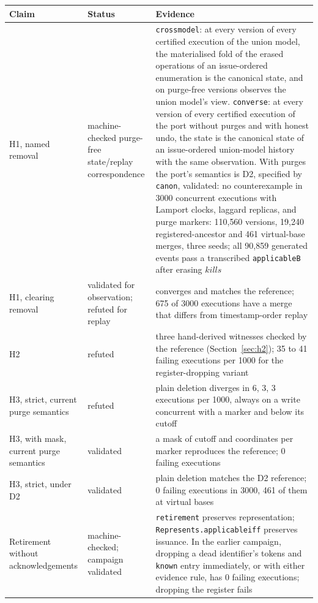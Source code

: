 \documentclass[11pt]{article}
\newcommand{\lean}[1]{\texttt{\def\_{\textunderscore\allowbreak}#1}}
\begin{document}
\begin{table}[h]
\centering\small
\begin{tabular}{@{}p{}p{}p{}@{}}
\toprule
Claim & Status & Evidence \\
\midrule
H1, named removal & machine-checked purge-free state/replay correspondence & \lean{cross\_model}: at every version of every certified execution of the union model, the materialised fold of the erased operations of an issue-ordered enumeration is the canonical state, and on purge-free versions observes the union model's view. \lean{converse}: at every version of every certified execution of the port without purges and with honest undo, the state is the canonical state of an issue-ordered union-model history with the same observation. With purges the port's semantics is D2, specified by \lean{canon}, validated: no counterexample in 3000 concurrent executions with Lamport clocks, laggard replicas, and purge markers: 110{,}560 versions, 19{,}240 registered-ancestor and 461 virtual-base merges, three seeds; all 90{,}859 generated events pass a transcribed \lean{applicableB} after erasing $\mathit{kills}$ \\
H1, clearing removal & validated for observation; refuted for replay & converges and matches the reference; 675 of 3000 executions have a merge that differs from timestamp-order replay \\
H2 & refuted & three hand-derived witnesses checked by the reference (Section~\ref{sec:h2}); 35 to 41 failing executions per 1000 for the register-dropping variant \\
H3, strict, current purge semantics & refuted & plain deletion diverges in 6, 3, 3 executions per 1000, always on a write concurrent with a marker and below its cutoff \\
H3, with mask, current purge semantics & validated & a mask of cutoff and coordinates per marker reproduces the reference; 0 failing executions \\
H3, strict, under D2 & validated & plain deletion matches the D2 reference; 0 failing executions in 3000, 461 of them at virtual bases \\
Retirement without acknowledgements & machine-checked; campaign validated & \lean{retirement} preserves representation; \lean{Represents.applicable\_iff} preserves issuance. In the earlier campaign, dropping a dead identifier's tokens and \lean{known} entry immediately, or with either evidence rule, has 0 failing executions; dropping the register fails \\

\end{tabular}
\end{table}
\end{document}
